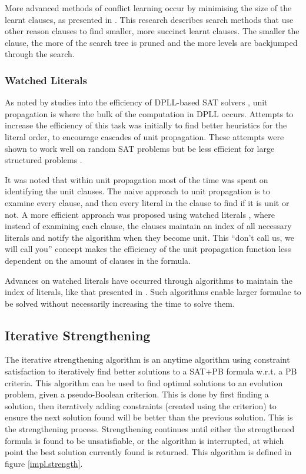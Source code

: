 More advanced methods of conflict learning occur by minimising the size of the learnt clauses, as presented in \citep{sorensson2009}.
This research describes search methods that use other reason clauses to find smaller, more succinct learnt clauses.
The smaller the clause, the more of the search tree is pruned and the more levels are backjumped through the search.

\subsubsection{Watched Literals}
As noted by studies into the efficiency of DPLL-based SAT solvers \citep{dixon2004automating}, unit propagation is where the bulk of the computation in DPLL occurs.
Attempts to increase the efficiency of this task was initially to find better heuristics \citep{JamesMCrawford1996} for the literal order, to encourage cascades of unit propagation.
These attempts were shown to work well on random SAT problems but be less efficient for large structured problems \citep{dixon2004automating}.

It was noted that within unit propagation most of the time was spent on identifying the unit clauses.
The naive approach to unit propagation is to examine every clause, and then every literal in the clause to find if it is unit or not.
A more efficient approach was proposed using watched literals \citep{Madigan2001}, where instead of examining each clause, 
the clauses maintain an index of all necessary literals and notify the algorithm when they become unit.
This ``don't call us, we will call you'' concept makes the efficiency of the unit propagation function less dependent on the amount of clauses in the formula.

Advances on watched literals have occurred through algorithms to maintain the index of literals, like that presented in \citep{Moskewicz2001}.
Such algorithms enable larger formulae to be solved without necessarily increasing the time to solve them.

\subsection{Iterative Strengthening}
The iterative strengthening algorithm  \citep{calistri1994iterative, le2010sat4j} 
is an anytime algorithm using constraint satisfaction to iteratively find better solutions to a SAT+PB formula w.r.t. a PB criteria.
This algorithm can be used to find optimal solutions to an evolution problem, given a pseudo-Boolean criterion.
This is done by first finding a solution, then iteratively adding constraints (created using the criterion) to ensure the next solution found will be better than the previous solution.
This is the strengthening process.
Strengthening continues until either the strengthened formula is found to be unsatisfiable, or the algorithm is interrupted, at which point the best solution currently found is returned. 
This algorithm is defined in figure \ref{impl.strength}.

